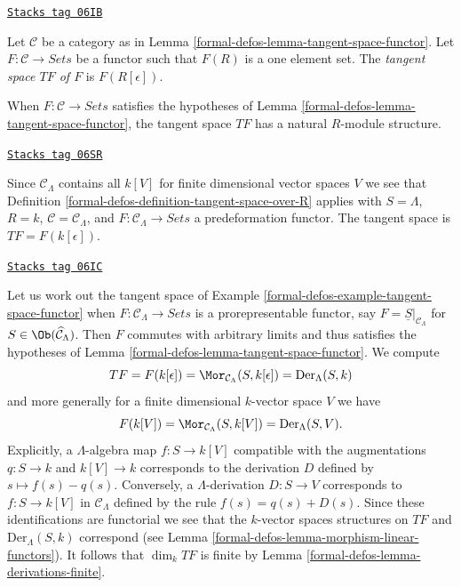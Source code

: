 \begin{definition}
\label{formal-defos-definition-tangent-space-over-R}
\href{https://stacks.math.columbia.edu/tag/06IB}{\texttt{Stacks tag 06IB}}

Let $\mathcal{C}$ be a category as in
Lemma \ref{formal-defos-lemma-tangent-space-functor}.
Let $F : \mathcal{C} \to \textit{Sets}$ be a functor such that
$F(R)$ is a one element set. The {\it tangent space $TF$ of $F$} is
$F(R[\epsilon])$.
\end{definition}

When $F : \mathcal{C} \to \textit{Sets}$ satisfies the hypotheses of
Lemma \ref{formal-defos-lemma-tangent-space-functor},
the tangent space $TF$ has a natural $R$-module structure.

\begin{example}
\label{formal-defos-example-tangent-space-functor}
\href{https://stacks.math.columbia.edu/tag/06SR}{\texttt{Stacks tag 06SR}}

Since $\mathcal{C}_\Lambda$ contains all $k[V]$ for finite dimensional
vector spaces $V$ we see that
Definition \ref{formal-defos-definition-tangent-space-over-R} applies with
$S = \Lambda$, $R = k$, $\mathcal{C} = \mathcal{C}_\Lambda$, and
$F : \mathcal{C}_\Lambda \to \textit{Sets}$ a
predeformation functor. The tangent space is $TF = F(k[\epsilon])$.
\end{example}

\begin{example}
\label{formal-defos-example-tangent-space-prorepresentable-functor}
\href{https://stacks.math.columbia.edu/tag/06IC}{\texttt{Stacks tag 06IC}}

Let us work out the tangent space of
Example \ref{formal-defos-example-tangent-space-functor}
when $F : \mathcal{C}_\Lambda \to \textit{Sets}$ is a
prorepresentable functor, say $F = \underline{S}|_{\mathcal{C}_\Lambda}$
for $S \in \Ob(\widehat{\mathcal{C}}_\Lambda)$. Then $F$ commutes
with arbitrary limits and thus satisfies the hypotheses of
Lemma \ref{formal-defos-lemma-tangent-space-functor}.
We compute
$$
TF = F(k[\epsilon]) = \Mor_{\mathcal{C}_\Lambda}(S, k[\epsilon])
= \text{Der}_\Lambda(S, k)
$$
and more generally for a finite dimensional $k$-vector space $V$ we have
$$
F(k[V]) = \Mor_{\mathcal{C}_\Lambda}(S, k[V]) = \text{Der}_\Lambda(S, V).
$$
Explicitly, a $\Lambda$-algebra map $f : S \to k[V]$ compatible with
the augmentations $q : S \to k$ and $k[V] \to k$ corresponds to the derivation
$D$ defined by $s \mapsto f(s) - q(s)$. Conversely, a
$\Lambda$-derivation $D : S \to V$ corresponds to $f : S \to k[V]$
in $\mathcal{C}_\Lambda$ defined by the rule $f(s) = q(s) + D(s)$. Since
these identifications are functorial we see that the $k$-vector spaces
structures on $TF$ and $\text{Der}_\Lambda(S, k)$ correspond (see
Lemma \ref{formal-defos-lemma-morphism-linear-functors}).
It follows that $\dim_k TF$ is finite by
Lemma \ref{formal-defos-lemma-derivations-finite}.
\end{example}

